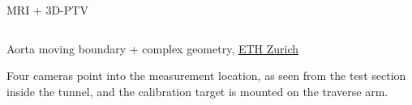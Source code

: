 \begin{frame}[label=app-15]{MRI + 3D-PTV}
    \begin{columns}
        \centering{}
    \end{columns}
\end{frame}

\begin{frame}[label=app-4a]{Aorta moving boundary + complex geometry, \href{https://www.dropbox.com/s/p1xnc7mefoqboti/aorta_rigid.mp4?dl=0}{ETH Zurich}}
\end{frame}
    
\begin{frame}[label=iibr-2]
    \begin{multicols}{2}
    \centering
    \end{multicols}
    \begin{cardTiny}
    Four cameras point into the measurement location, as seen from the test section inside the tunnel, and the calibration target is mounted on the traverse arm.
    \end{cardTiny}
\end{frame}
    
\begin{frame}[label=iibr-1]
    \begin{multicols}{2}
    \centering{}
    \end{multicols}
\end{frame}
    
